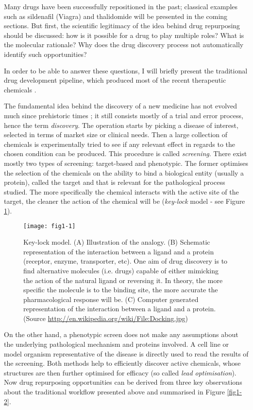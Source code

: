 Many drugs have been successfully repositioned in the past; classical examples such as sildenafil (Viagra) and thalidomide will be presented in the coming sections. But first, the scientific legitimacy of the idea behind drug repurposing should be discussed: how is it possible for a drug to play multiple roles? What is the molecular rationale? Why does the drug discovery process not automatically identify such opportunities?

In order to be able to answer these questions, I will briefly present the traditional drug development pipeline, which produced most of the recent therapeutic chemicals \citep{swinney2011were}.

The fundamental idea behind the discovery of a new medicine has not evolved much since prehistoric times \citep{prehistoricwiki}; it still consists mostly of a trial and error process, hence the term \emph{discovery}. The operation starts by picking a disease of interest, selected in terms of market size or clinical needs. Then a large collection of chemicals is experimentally tried to see if any relevant effect in regards to the chosen condition can be produced. This procedure is called \emph{screening}. There exist mostly two types of screening: target-based and phenotypic. The former optimises the selection of the chemicals on the ability to bind a biological entity (usually a protein), called the target and that is relevant for the pathological process studied. The more specifically the chemical interacts with the active site of the target, the cleaner the action of the chemical will be (\emph{key-lock} model - see Figure \ref{fig1-1}).

\begin{figure}[ht]
    \centering
    \texttt{[image: fig1-1]}
    \caption{Key-lock model. (A) Illustration of the analogy. (B) Schematic representation of the interaction between a ligand and a protein (receptor, enzyme, transporter, etc). One aim of drug discovery is to find alternative molecules (i.e. drugs) capable of either mimicking the action of the natural ligand or reversing it. In theory, the more specific the molecule is to the binding site, the more accurate the pharmacological response will be. (C) Computer generated representation of the interaction between a ligand and a protein. (Source \url{http://en.wikipedia.org/wiki/File:Docking.jpg})}
    \label{fig1-1}
\end{figure}

On the other hand, a phenotypic screen does not make any assumptions about the underlying pathological mechanism and proteins involved. A cell line or model organism representative of the disease is directly used to read the results of the screening. Both methods help to efficiently discover active chemicals, whose structures are then further optimised for efficacy (so called \emph{lead optimisation}). Now drug repurposing opportunities can be derived from three key observations \citep{barratt2012drug} about the traditional workflow presented above and summarised in Figure \ref{fig1-2}.

